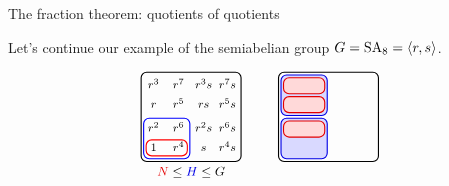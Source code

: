 \documentclass[8pt, handout]{beamer}
\begin{document}
\begin{frame}{The fraction theorem: quotients of quotients} \smallskip
  
  Let's continue our example of the semiabelian group
  $G=\operatorname{SA}_8=\langle r,s\rangle$. \smallskip
  

  \[
  \begin{tikzpicture}[xscale=.9,scale=.7]
    \begin{scope}[shift={(0,0)}]
      \tikzstyle{every node}=[font=\footnotesize,anchor=south]
      \begin{scope}[shift={(0,3.5)}]
        \draw[thick,rounded corners] (0,0) rectangle (4,3.2);
        \draw[thick,eBlue,rounded corners] (.1,.1) rectangle (1.95,1.55);     
        \draw[thick,eRed,rounded corners] (.2,.2) rectangle (1.85,.2+.575);
        \node at (.5,2.45) {$r^3$};
        \node at (1.5,2.45) {$r^7$};
        \node at (.5,1.75) {$r$};
        \node at (1.5,1.75) {$r^5$};
        \node at (2.5,2.45) {$r^3s$};
        \node at (3.45,2.45) {$r^7s$};
        \node at (2.5,1.75) {$rs$};
        \node at (3.45,1.75) {$r^5s$};
        \node at (.5,.9) {$r^2$};
        \node at (1.5,.9) {$r^6$};
        \node at (.5,.2) {$1$};
        \node at (1.5,.2) {$r^4$};
        \node at (2.5,.9) {$r^2s$};
        \node at (3.45,.9) {$r^6s$};
        \node at (2.5,.2) {$s$};
        \node at (3.45,.2) {$r^4s$};
        \node at (2,-.75) {\small $\Alert{N}\leq \Balert{H}\leq G$};
      \end{scope}
    \end{scope}
    \begin{scope}[shift={(5.5,0)}]
      \tikzstyle{every node}=[font=\footnotesize,anchor=south,faded]
      \begin{scope}[shift={(0,3.5)}]
        \draw[thick,rounded corners] (0,0) rectangle (4,3.2);
        \draw[thick,xBlue,fill=cosetBlue,rounded corners] (.1,1.65) rectangle (1.95,3.1);
        \draw[thick,xRed,fill=cosetRed,rounded corners] (.2,3-.575) rectangle (1.85,3);
        \draw[thick,xRed,fill=cosetRed,rounded corners] (.2,1.75) rectangle (1.85,1.75+.575);
        \draw[thick,xBlue,fill=cosetBlue,rounded corners] (.1,.1) rectangle (1.95,1.55);     
        \draw[thick,xRed,fill=cosetRed,rounded corners] (.2,1.45-.575) rectangle (1.85,1.45);

\end{scope}
\end{scope}
\end{tikzpicture}\]
\end{frame}
\end{document}

